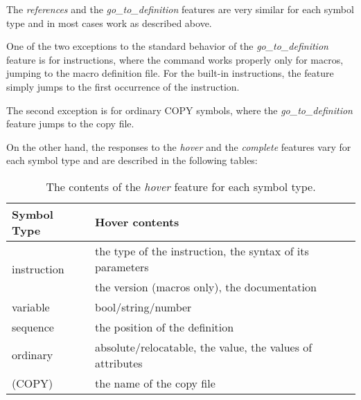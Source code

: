 The \emph{references} and the \emph{go\_to\_definition} features are very similar for each symbol type and in most cases work as described above. 

One of the two exceptions to the standard behavior of the \emph{go\_to\_definition} feature is for instructions, where the command works properly only for macros, jumping to the macro definition file. For the built-in instructions, the feature simply jumps to the first occurrence of the instruction.

The second exception is for ordinary COPY symbols, where the \emph{go\_to\_definition} feature jumps to the copy file.

On the other hand, the responses to the \emph{hover} and the \emph{complete} features vary for each symbol type and are described in the following tables:
\begin{table}[h]
	\centering
	\begin{tabular}{ll}
		\toprule
		\textbf{Symbol Type}            & \textbf{Hover contents}                              \\ \midrule
		\multirow{2}{4cm}{instruction}  & the type of the instruction, the syntax of its parameters \\ 
		                                & the version (macros only), the documentation \\ \midrule
		variable                        & bool/string/number                           \\ \midrule
		sequence                        & the position of the definition                \\ \midrule
		ordinary                        & absolute/relocatable, the value, the values of attributes \\
		(COPY)                          & the name of the copy file                               \\  
		\bottomrule
	\end{tabular}
	\caption{The contents of the \emph{hover} feature for each symbol type.}
\end{table}

